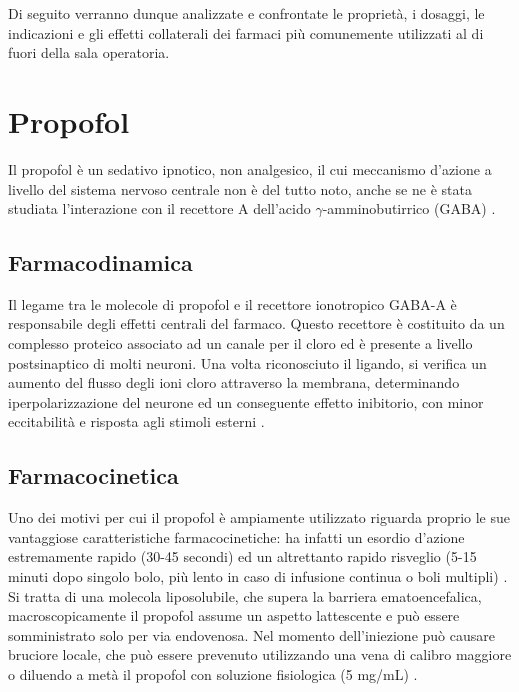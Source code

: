 Di seguito verranno dunque analizzate e confrontate le proprietà, i dosaggi, le indicazioni e gli effetti collaterali dei farmaci più comunemente utilizzati al di fuori della sala operatoria. 

\section{Propofol}

Il propofol è un sedativo ipnotico, non analgesico, il cui meccanismo d'azione a livello del sistema nervoso centrale non è del tutto noto, anche se ne è stata studiata l'interazione con il recettore A dell'acido $\gamma$-amminobutirrico (GABA) \cite{Propofol2015}.

\subsection*{Farmacodinamica}

Il legame tra le molecole di propofol e il recettore ionotropico GABA-A è responsabile degli effetti centrali del farmaco. Questo recettore è costituito da un complesso proteico associato ad un canale per il cloro ed è presente a livello postsinaptico di molti neuroni. Una volta riconosciuto il ligando, si verifica un aumento del flusso degli ioni cloro attraverso la membrana, determinando iperpolarizzazione del neurone ed un conseguente effetto inibitorio, con minor eccitabilità e risposta agli stimoli esterni \cite{Propofol2015}.

\subsection*{Farmacocinetica}

Uno dei motivi per cui il propofol è ampiamente utilizzato riguarda proprio le sue vantaggiose caratteristiche farmacocinetiche: ha infatti un esordio d'azione estremamente rapido (30-45 secondi) ed un altrettanto rapido risveglio (5-15 minuti dopo singolo bolo, più lento in caso di infusione continua o boli multipli) \cite{Simeupsedazione, Uptodatepharmacology}. Si tratta di una molecola liposolubile, che supera la barriera ematoencefalica, macroscopicamente il propofol assume un aspetto lattescente e può essere somministrato solo per via endovenosa. Nel momento dell'iniezione può causare bruciore locale, che può essere prevenuto utilizzando una vena di calibro maggiore o diluendo a metà il propofol con soluzione fisiologica (5 mg/mL) \cite{Simeupsedazione}. 

